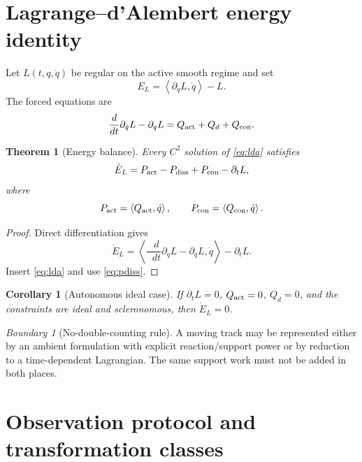 \documentclass[11pt,a4paper]{article}
\theoremstyle{definition}
\theoremstyle{plain}
\newtheorem{theorem}[definition]{Theorem}
\newtheorem{corollary}[definition]{Corollary}
\theoremstyle{remark}
\newtheorem{warning}[definition]{Boundary}
\newcommand{\dd}{\mathop{}\!d}
\newcommand{\pair}[2]{\left\langle #1,#2\right\rangle}
\begin{document}
\section{Lagrange--d'Alembert energy identity}

Let \(L(t,q,\dot q)\) be regular on the active smooth regime and set
\[
E_L=\pair{\partial_{\dot q}L}{\dot q}-L.
\]
The forced equations are
\begin{equation}\label{eq:lda}
\frac{\dd}{\dd t}\partial_{\dot q}L-\partial_qL
=Q_{\rm act}+Q_d+Q_{\rm con}.
\end{equation}

\begin{theorem}[Energy balance]\label{thm:energy-balance}
Every \(C^2\) solution of \cref{eq:lda} satisfies
\begin{equation}\label{eq:energy-balance}
\dot E_L
=P_{\rm act}-P_{\rm diss}+P_{\rm con}-\partial_tL,
\end{equation}
where
\[
P_{\rm act}=\pair{Q_{\rm act}}{\dot q},\qquad
P_{\rm con}=\pair{Q_{\rm con}}{\dot q}.
\]
\end{theorem}

\begin{proof}
Direct differentiation gives
\[
\dot E_L
=\pair{\frac{\dd}{\dd t}\partial_{\dot q}L-\partial_qL}{\dot q}
-\partial_tL.
\]
Insert \cref{eq:lda} and use
\cref{eq:pdiss}.
\end{proof}

\begin{corollary}[Autonomous ideal case]
If \(\partial_tL=0\), \(Q_{\rm act}=0\),
\(Q_d=0\), and the constraints are ideal and scleronomous, then
\(\dot E_L=0\).
\end{corollary}

\begin{warning}[No-double-counting rule]
A moving track may be represented either by an ambient formulation
with explicit reaction/support power or by reduction to a
time-dependent Lagrangian. The same support work must not be added in
both places.
\end{warning}

\section{Observation protocol and transformation classes}
\end{document}
